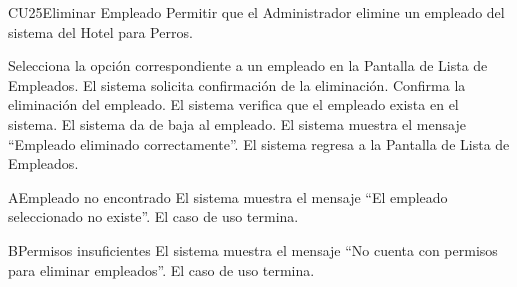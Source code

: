 
\begin{UseCase}{CU25}{Eliminar Empleado}{
	Permitir que el Administrador elimine un empleado del sistema del Hotel para Perros.
}
\end{UseCase}

\begin{UCtrayectoria}
	\UCpaso[\UCactor] Selecciona la opción  correspondiente a un empleado en la Pantalla de Lista de Empleados.
	\UCpaso El sistema solicita confirmación de la eliminación.
	\UCpaso[\UCactor] Confirma la eliminación del empleado.
	\UCpaso El sistema verifica que el empleado exista en el sistema.
	\UCpaso El sistema da de baja al empleado.
	\UCpaso El sistema muestra el mensaje ``Empleado eliminado correctamente''.
	\UCpaso El sistema regresa a la Pantalla de Lista de Empleados.
\end{UCtrayectoria}

\begin{UCtrayectoriaA}{A}{Empleado no encontrado}
	\UCpaso El sistema muestra el mensaje ``El empleado seleccionado no existe''.
	\UCpaso El caso de uso termina.
\end{UCtrayectoriaA}

\begin{UCtrayectoriaA}{B}{Permisos insuficientes}
	\UCpaso El sistema muestra el mensaje ``No cuenta con permisos para eliminar empleados''.
	\UCpaso El caso de uso termina.
\end{UCtrayectoriaA}

